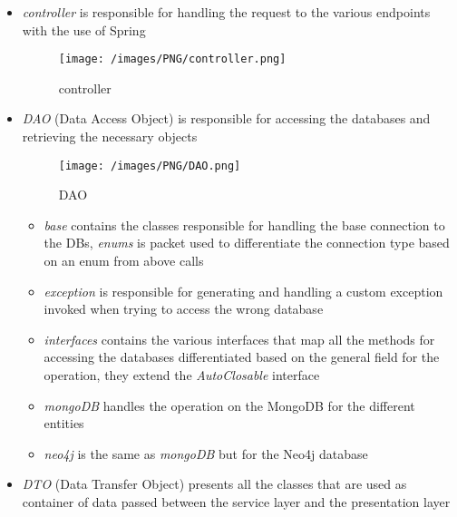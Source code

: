 \begin{itemize}
	\item \emph{controller} is responsible for handling the request to the various endpoints with the use of Spring
	\begin{figure}[H]
	\begin{center}
	\texttt{[image: /images/PNG/controller.png]}
	\caption{controller}
	\end{center}
	\end{figure}
	
	\item \emph{DAO} (Data Access Object) is responsible for accessing the databases and retrieving the necessary objects
	\begin{figure}[H]
	\begin{center}
	\texttt{[image: /images/PNG/DAO.png]}
	\caption{DAO}
	\end{center}
	\end{figure}
	\begin{itemize}
		\item \emph{base} contains the classes responsible for handling the base connection to the DBs, \emph{enums} is packet used to differentiate the connection type based on an enum from above calls
	
		\item \emph{exception} is responsible for generating and handling a custom exception invoked when trying to access the wrong database
	
		\item \emph{interfaces} contains the various interfaces that map all the methods for accessing the databases differentiated based on the general field for the operation, they extend the \emph{AutoClosable} interface
		\item \emph{mongoDB} handles the operation on the MongoDB for the different entities
		\item \emph{neo4j} is the same as \emph{mongoDB} but for the Neo4j database
	
	\end{itemize}
	\item \emph{DTO} (Data Transfer Object) presents all the classes that are used as container of data passed between the service layer and the presentation layer
	

\end{itemize}
